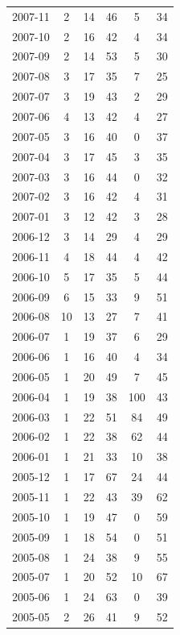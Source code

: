 \documentclass[12pt]{report}
\begin{document}
\begin{longtable}{|c|c|c|c|c|c|}
            2007-11 & 2 & 14 & 46 & 5 & 34 \\
            2007-10 & 2 & 16 & 42 & 4 & 34 \\
            2007-09 & 2 & 14 & 53 & 5 & 30 \\
            2007-08 & 3 & 17 & 35 & 7 & 25 \\
            2007-07 & 3 & 19 & 43 & 2 & 29 \\
            2007-06 & 4 & 13 & 42 & 4 & 27 \\
            2007-05 & 3 & 16 & 40 & 0 & 37 \\
            2007-04 & 3 & 17 & 45 & 3 & 35 \\
            2007-03 & 3 & 16 & 44 & 0 & 32 \\
            2007-02 & 3 & 16 & 42 & 4 & 31 \\
            2007-01 & 3 & 12 & 42 & 3 & 28 \\
            2006-12 & 3 & 14 & 29 & 4 & 29 \\
            2006-11 & 4 & 18 & 44 & 4 & 42 \\
            2006-10 & 5 & 17 & 35 & 5 & 44 \\
            2006-09 & 6 & 15 & 33 & 9 & 51 \\
            2006-08 & 10 & 13 & 27 & 7 & 41 \\
            2006-07 & 1 & 19 & 37 & 6 & 29 \\
            2006-06 & 1 & 16 & 40 & 4 & 34 \\
            2006-05 & 1 & 20 & 49 & 7 & 45 \\
            2006-04 & 1 & 19 & 38 & 100 & 43 \\
            2006-03 & 1 & 22 & 51 & 84 & 49 \\
            2006-02 & 1 & 22 & 38 & 62 & 44 \\
            2006-01 & 1 & 21 & 33 & 10 & 38 \\
            2005-12 & 1 & 17 & 67 & 24 & 44 \\
            2005-11 & 1 & 22 & 43 & 39 & 62 \\
            2005-10 & 1 & 19 & 47 & 0 & 59 \\
            2005-09 & 1 & 18 & 54 & 0 & 51 \\
            2005-08 & 1 & 24 & 38 & 9 & 55 \\
            2005-07 & 1 & 20 & 52 & 10 & 67 \\
            2005-06 & 1 & 24 & 63 & 0 & 39 \\
            2005-05 & 2 & 26 & 41 & 9 & 52 \\

\end{longtable}
\end{document}

